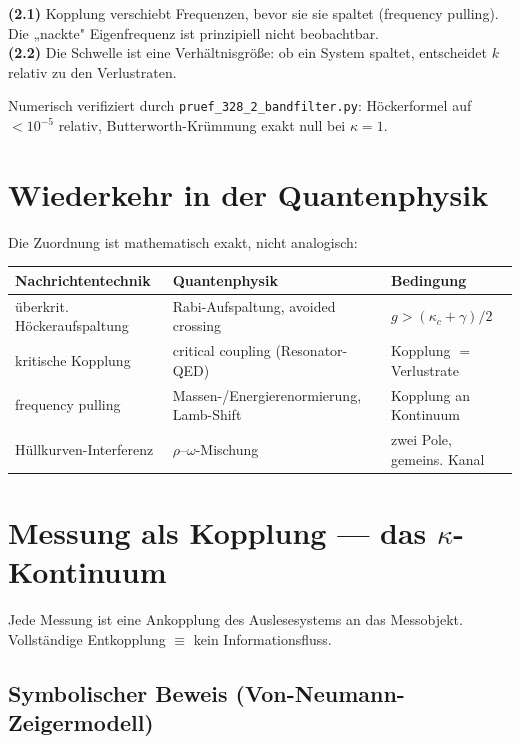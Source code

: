 \begin{tcolorbox}[etabliertbox,title={Zwei strukturelle Aussagen \E}]
\textbf{(2.1)} Kopplung verschiebt Frequenzen, bevor sie sie spaltet (frequency
pulling). Die „nackte" Eigenfrequenz ist prinzipiell nicht beobachtbar.\\[2pt]
\textbf{(2.2)} Die Schwelle ist eine Verhältnisgröße: ob ein System spaltet,
entscheidet $k$ relativ zu den Verlustraten.
\end{tcolorbox}

\noindent Numerisch verifiziert durch \texttt{pruef\_328\_2\_bandfilter.py}:
Höckerformel auf $<10^{-5}$ relativ, Butterworth-Krümmung exakt null bei
$\kappa=1$.

\section{Wiederkehr in der Quantenphysik \E}

Die Zuordnung ist mathematisch exakt, nicht analogisch:

\begin{center}
\begin{tabular}{lll}
\toprule
\textbf{Nachrichtentechnik} & \textbf{Quantenphysik} & \textbf{Bedingung}\\
\midrule
überkrit. Höckeraufspaltung & Rabi-Aufspaltung, avoided crossing & $g > (\kappa_c+\gamma)/2$\\
kritische Kopplung & critical coupling (Resonator-QED) & Kopplung $=$ Verlustrate\\
frequency pulling & Massen-/Energierenormierung, Lamb-Shift & Kopplung an Kontinuum\\
Hüllkurven-Interferenz & $\rho$–$\omega$-Mischung & zwei Pole, gemeins. Kanal\\
\bottomrule
\end{tabular}
\end{center}

\section{Messung als Kopplung — das $\kappa$-Kontinuum \B}

Jede Messung ist eine Ankopplung des Auslesesystems an das Messobjekt.
Vollständige Entkopplung $\equiv$ kein Informationsfluss.

\subsection{Symbolischer Beweis (Von-Neumann-Zeigermodell)}

